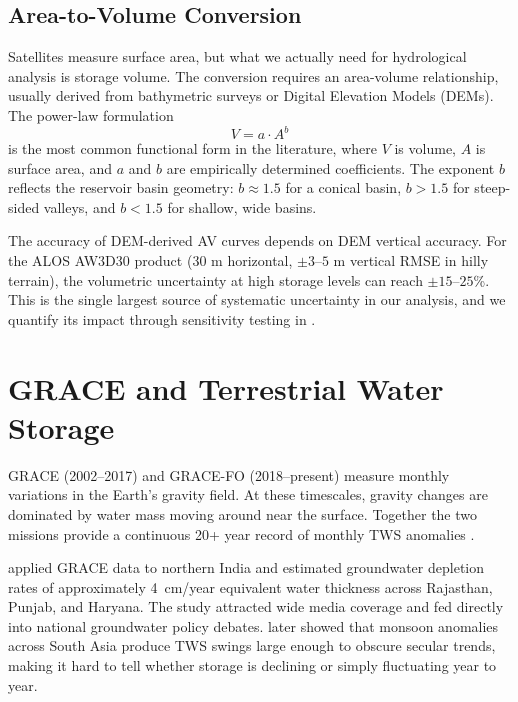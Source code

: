 \documentclass[12pt,a4paper,oneside]{report}
\begin{document}
\subsection{Area-to-Volume Conversion}

Satellites measure surface area, but what we actually need for hydrological
analysis is storage volume. The conversion requires an area-volume
relationship, usually derived from bathymetric surveys or Digital Elevation
Models (DEMs). The power-law formulation
\begin{equation}
  V = a \cdot A^b
  \label{eq:av_power}
\end{equation}
is the most common functional form in the literature, where $V$ is volume,
$A$ is surface area, and $a$ and $b$ are empirically determined coefficients.
The exponent $b$ reflects the reservoir basin geometry: $b \approx 1.5$ for
a conical basin, $b > 1.5$ for steep-sided valleys, and $b < 1.5$ for
shallow, wide basins.

The accuracy of DEM-derived AV curves depends on DEM vertical accuracy. For
the ALOS AW3D30 product (30 m horizontal, $\pm 3$--$5$ m vertical RMSE in
hilly terrain), the volumetric uncertainty at high storage levels can reach
$\pm 15$--$25$\%. This is the single largest source of systematic
uncertainty in our analysis, and we quantify its impact through sensitivity
testing in .

\section{GRACE and Terrestrial Water Storage}

GRACE (2002--2017) and GRACE-FO (2018--present) measure monthly variations
in the Earth's gravity field. At these timescales, gravity changes are
dominated by water mass moving around near the surface. Together the two
missions provide a continuous 20+ year record of monthly TWS anomalies
\citep{Tapley2019}.

\citet{Rodell2009} applied GRACE data to northern India and estimated
groundwater depletion rates of approximately 4~cm/year equivalent water
thickness across Rajasthan, Punjab, and Haryana. The study attracted wide
media coverage and fed directly into national groundwater policy debates.
\citet{Long2020} later showed that monsoon anomalies across South Asia
produce TWS swings large enough to obscure secular trends, making it hard
to tell whether storage is declining or simply fluctuating year to year.
\end{document}
